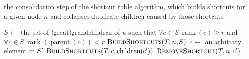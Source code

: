 \begin{algorithm}[h]
  \caption{the consolidation step of the shortcut table algorithm, which builds shortcuts for a given node $n$ and collapses duplicate children caused by those shortcuts}
  \label{alg:consolidation}
  \begin{algorithmic}[1]
      \State $S \gets$ the set of (great)grandchildren of $n$ such that $\forall c \in S\ \operatorname{rank}(c) \ge r$ and $\forall c \in S\ \operatorname{rank}(\operatorname{parent}(c)) < r$ 
      \State $\textsc{BuildShortcuts}(T, n, S)$
        \State $c \gets$ an arbitrary element in $S'$ 
          \State $\textsc{BuildShortcuts}(T, c, \operatorname{children}(c'))$
          \State $\textsc{RemoveShortcut}(T, n, c')$
        \EndFor
      \EndFor 
    \EndFunction
  \end{algorithmic}
\end{algorithm}
